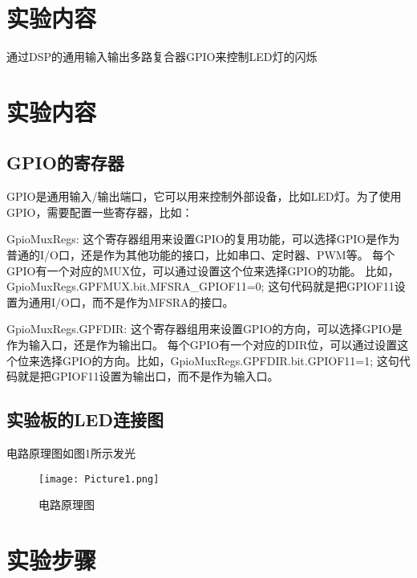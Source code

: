 \documentclass{math201}
\begin{document}

\makecover


\section{实验内容}

通过DSP的通用输入输出多路复合器GPIO来控制LED灯的闪烁

\section{实验内容}

\subsection{GPIO的寄存器}

GPIO是通用输入/输出端口，它可以用来控制外部设备，比如LED灯。为了使用GPIO，需要配置一些寄存器，比如：

GpioMuxRegs: 这个寄存器组用来设置GPIO的复用功能，可以选择GPIO是作为普通的I/O口，还是作为其他功能的接口，比如串口、定时器、PWM等。
每个GPIO有一个对应的MUX位，可以通过设置这个位来选择GPIO的功能。
比如，GpioMuxRegs.GPFMUX.bit.MFSRA\_GPIOF11=0; 这句代码就是把GPIOF11设置为通用I/O口，而不是作为MFSRA的接口。

GpioMuxRegs.GPFDIR: 这个寄存器组用来设置GPIO的方向，可以选择GPIO是作为输入口，还是作为输出口。
每个GPIO有一个对应的DIR位，可以通过设置这个位来选择GPIO的方向。比如，GpioMuxRegs.GPFDIR.bit.GPIOF11=1;
这句代码就是把GPIOF11设置为输出口，而不是作为输入口。

\subsection{实验板的LED连接图}

电路原理图如图1所示发光

\begin{figure}[H]  
    \centering\texttt{[image: Picture1.png]}  
    \caption{电路原理图}     
    \label{img01}   
\end{figure}

\section{实验步骤}
\end{document}
